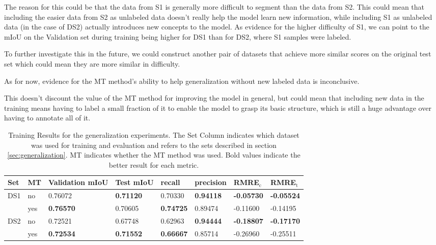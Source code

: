 The reason for this could be that the data from S1 is generally more difficult to segment than the data from S2. 
This could mean that including the easier data from S2 as unlabeled data doesn't really help the model learn new information, while including S1 as unlabeled data (in the case of DS2) actually introduces new concepts to the model.
As evidence for the higher difficulty of S1, we can point to the mIoU on the Validation set during training being higher for DS1 than for DS2, where S1 samples were labeled.

To further investigate this in the future, we could construct another pair of datasets that achieve more similar scores on the original test set which could mean they are more similar in difficulty. 

As for now, evidence for the MT method's ability to help generalization without new labeled data is inconclusive. 

This doesn't discount the value of the MT method for improving the model in general, but could mean that including new data in the training means having to label a small fraction of it to enable the model to grasp its basic structure, which is still a huge advantage over having to annotate all of it.

\begin{table}[htbp]
    \centering
    \begin{tabular}{llllllll} 
        \toprule
        Set & MT  & Validation mIoU    & Test mIoU        & recall           & precision        & RMRE$_\text{c}$   & RMRE$_\text{t}$   \\ \midrule
        DS1 & no  & 0.76072          & \textbf{0.71120} & 0.70330          & \textbf{0.94118} & \textbf{-0.05730} & \textbf{-0.05524} \\
            & yes & \textbf{0.76570} & 0.70605          & \textbf{0.74725} & 0.89474          & -0.11600          & -0.14195          \\
        DS2 & no  & 0.72521          & 0.67748          & 0.62963          & \textbf{0.94444} & \textbf{-0.18807} & \textbf{-0.17170} \\
            & yes & \textbf{0.72534} & \textbf{0.71552} & \textbf{0.66667} & 0.85714          & -0.26960          & -0.25511          \\ \bottomrule
    \end{tabular}
    \vspace*{0.2cm}
    \caption{Training Results for the generalization experiments. The Set Column indicates which dataset was used for training and evaluation and refers to the sets described in section \ref{sec:generalization}. MT indicates whether the MT method was used. Bold values indicate the better result for each metric.}
    \label{tab:generalization}
\end{table}
